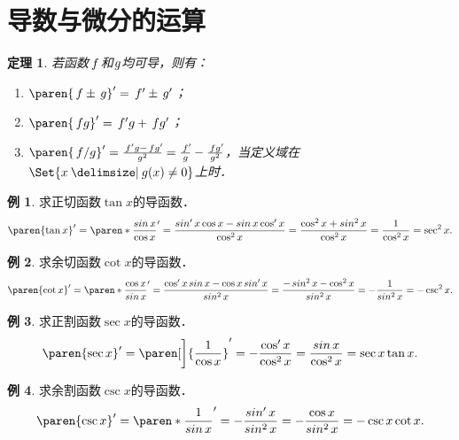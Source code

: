 \documentclass[a4paper,punct=CCT]{ctexbook}
\renewcommand*{\enumparen}[1]{（\makebox[0.6em][c]{\normalfont#1}）}
\newtheorem*{theorem*}{定理}
\theoremstyle{definition}
\newtheorem*{example*}{例}
\theoremstyle{remark}
\begin{document}
\section{导数与微分的运算}

\begin{theorem*}
  \label{thm:deriv4ops}
  若函数\(\,f\mkern2mu\)和\(\mkern1mu g\)均可导，则有：
  \begin{enumerate}
    \renewcommand{\labelenumi}{\enumparen{\arabic{enumi}}}
  \item \(\paren{\,f \pm \,g}' = \,f' \pm \,g'\)；
  \item \(\paren{\,fg}' = \,f'g + \,fg'\)；
  \item \(\paren{\,f/g}' = \frac{\,f'g - \,fg'\!}{g^2} = \frac{\,f'\!}{g} - \frac{\,fg'\!}{g^2}\)，当定义域在\(\Set{x \mid g(x) \ne 0}\)上时．
  \end{enumerate}
\end{theorem*}

\begin{example*}
  求正切函数\(\tan x\)的导函数．
  \begin{equation*}
    \paren{\tan x}'
    = \paren*{\frac{\sin x}{\cos x}}'
    = \frac{\sin' x \cos x - \sin x \cos' x}{\cos^2 x}
    = \frac{\cos^2 x + \sin^2 x}{\cos^2 x}
    = \frac{1}{\cos^2 x}
    = \sec^2 x.
  \end{equation*}
\end{example*}

\begin{example*}
  求余切函数\(\cot x\)的导函数．
  \begin{equation*}
    \paren{\cot x}'
    = \paren*{\frac{\cos x}{\sin x}}'
    = \frac{\cos' x \sin x - \cos x \sin' x}{\sin^2 x}
    = \frac{-\sin^2 x - \cos^2 x}{\sin^2 x}
    = -\frac{1}{\sin^2 x}
    = -\csc^2 x.
  \end{equation*}
\end{example*}

\begin{example*}
  求正割函数\(\sec x\)的导函数．
  \begin{equation*}
    \paren{\sec x}'
    = \paren[\bigg]{\frac{1}{\cos x}}'
    = -\frac{\cos' x}{\cos^2 x}
    = \frac{\sin x}{\cos^2 x}
    = \sec x \tan x.
  \end{equation*}
\end{example*}

\begin{example*}
  求余割函数\(\csc x\)的导函数．
  \begin{equation*}
    \paren{\csc x}'
    = \paren*{\frac{1}{\sin x}}'
    = -\frac{\sin' x}{\sin^2 x}
    = -\frac{\cos x}{\sin^2 x}
    = -\csc x \cot x.
  \end{equation*}
\end{example*}
\end{document}
